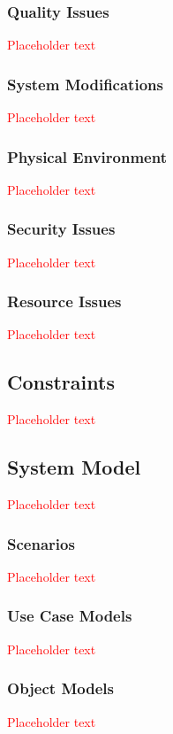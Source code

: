 \documentclass[a4paper, 11pt, titlepage]{article}
\begin{document}
\subsubsection{Quality Issues}
\textcolor{red}{Placeholder text}

\subsubsection{System Modifications}
\textcolor{red}{Placeholder text}

\subsubsection{Physical Environment}
\textcolor{red}{Placeholder text}

\subsubsection{Security Issues}
\textcolor{red}{Placeholder text}

\subsubsection{Resource Issues}
\textcolor{red}{Placeholder text}

\subsection{Constraints}
\textcolor{red}{Placeholder text}

\subsection{System Model}
\textcolor{red}{Placeholder text}

\subsubsection{Scenarios}
\textcolor{red}{Placeholder text}

\subsubsection{Use Case Models}
\textcolor{red}{Placeholder text}

\subsubsection{Object Models}
\textcolor{red}{Placeholder text}
\end{document}
